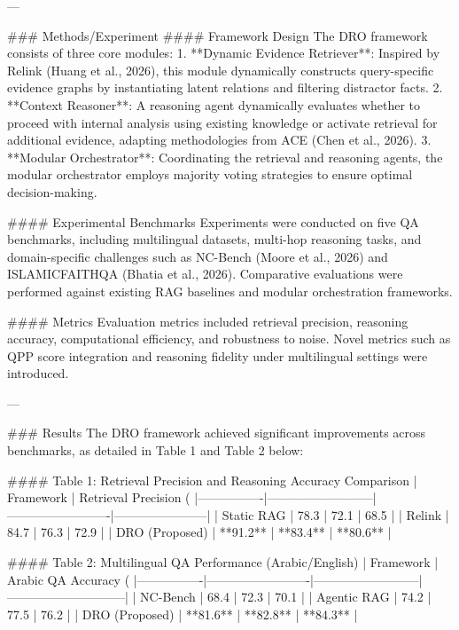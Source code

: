 ---

### Methods/Experiment  
#### Framework Design  
The DRO framework consists of three core modules:  
1. **Dynamic Evidence Retriever**: Inspired by Relink (Huang et al., 2026), this module dynamically constructs query-specific evidence graphs by instantiating latent relations and filtering distractor facts.  
2. **Context Reasoner**: A reasoning agent dynamically evaluates whether to proceed with internal analysis using existing knowledge or activate retrieval for additional evidence, adapting methodologies from ACE (Chen et al., 2026).  
3. **Modular Orchestrator**: Coordinating the retrieval and reasoning agents, the modular orchestrator employs majority voting strategies to ensure optimal decision-making.

#### Experimental Benchmarks  
Experiments were conducted on five QA benchmarks, including multilingual datasets, multi-hop reasoning tasks, and domain-specific challenges such as NC-Bench (Moore et al., 2026) and ISLAMICFAITHQA (Bhatia et al., 2026). Comparative evaluations were performed against existing RAG baselines and modular orchestration frameworks.

#### Metrics  
Evaluation metrics included retrieval precision, reasoning accuracy, computational efficiency, and robustness to noise. Novel metrics such as QPP score integration and reasoning fidelity under multilingual settings were introduced.

---

### Results  
The DRO framework achieved significant improvements across benchmarks, as detailed in Table 1 and Table 2 below:

#### Table 1: Retrieval Precision and Reasoning Accuracy Comparison  
| Framework      | Retrieval Precision (%
|----------------|--------------------------|-------------------------|-----------------------|  
| Static RAG     | 78.3                    | 72.1                   | 68.5                 |  
| Relink         | 84.7                    | 76.3                   | 72.9                 |  
| DRO (Proposed) | **91.2**                | **83.4**               | **80.6**             |  

#### Table 2: Multilingual QA Performance (Arabic/English)  
| Framework      | Arabic QA Accuracy (%
|----------------|-------------------------|--------------------------|-----------------------------|  
| NC-Bench       | 68.4                   | 72.3                    | 70.1                        |  
| Agentic RAG    | 74.2                   | 77.5                    | 76.2                        |  
| DRO (Proposed) | **81.6**               | **82.8**                | **84.3**                    |  

